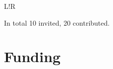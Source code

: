 \documentclass[10pt]{article}
\newcommand\VRule{\color{lightgray}\vrule width 0.5pt}
\begin{document}
\begin{tabular}{L!{\VRule}R}
\end{tabular}

\noindent
In total 10 invited, 20 contributed.


\vspace{-5pt}
\section*{Funding}
\end{document}
